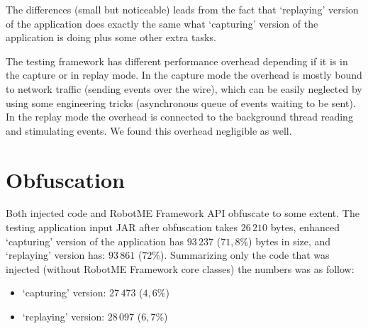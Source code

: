 The differences (small but noticeable) leads from the fact that `replaying' version of the application
does exactly the same what `capturing' version of the application is doing plus some other extra
tasks.

The testing framework has different performance overhead depending if it is
in the capture or in replay mode. In the capture mode the overhead is mostly
bound to network traffic (sending events over the wire), which can be easily
neglected by using some engineering tricks (asynchronous queue of events waiting
to be sent). In the replay mode the overhead is connected to the background
thread reading and stimulating events. We found this overhead negligible as
well.

\section{Obfuscation}


Both injected code and RobotME Framework API obfuscate to some extent. The testing application
input JAR after obfuscation takes $26\,210$ bytes, enhanced `capturing' version of the application
has $93\,237$ ($71{,}8$\%) bytes in size, and `replaying' version has: $93\,861$ ($72$\%).
Summarizing only the code that was injected (without RobotME Framework core classes) the numbers was as
follow:
\begin{itemize}
\item `capturing' version: $27\,473$ ($4{,}6$\%)
\item `replaying' version: $28\,097$ ($6{,}7$\%)
\end{itemize}

